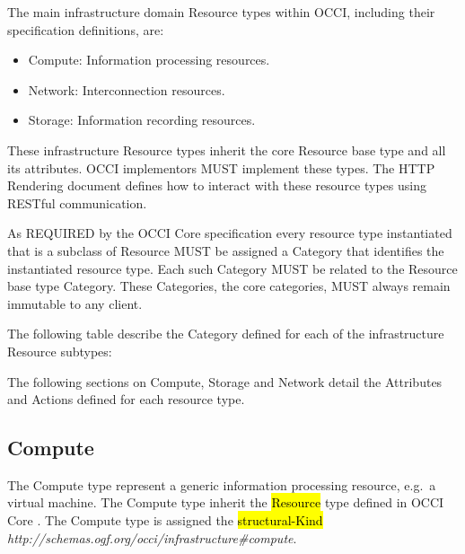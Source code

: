 \documentclass[10pt,a4paper]{article}
\begin{document}
The main infrastructure domain Resource types within OCCI, including their specification definitions, are:
\begin{itemize}
\item Compute: Information processing resources.
\item Network: Interconnection resources.
\item Storage: Information recording resources.
\end{itemize}
These infrastructure Resource types inherit the core Resource base type and all its attributes. OCCI implementors MUST implement these types. The HTTP Rendering document defines how to interact with these resource types using RESTful communication.

As REQUIRED by the OCCI Core specification every resource type instantiated that is a subclass of Resource MUST be assigned a Category that identifies the instantiated resource type. Each such Category MUST be related to the Resource base type Category. These Categories, the core categories, MUST always remain immutable to any client.

The following table describe the Category defined for each of the infrastructure Resource subtypes:


The following sections on Compute, Storage and Network detail the Attributes and Actions defined for each resource type.

\subsection{Compute}
The Compute type represent a generic information processing resource, e.g.~a
virtual machine. The Compute type inherit the \hl{Resource} type defined in
OCCI Core \cite{occi:core}.
The Compute type is assigned the \hl{structural-Kind}
\textit{http://schemas.ogf.org/occi/infrastructure\#compute}.
\end{document}
